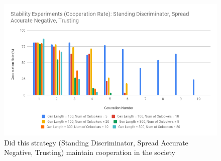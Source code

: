 \documentclass[]{final_report}
\begin{document}
\begin{figure}
\begin{framed}
	\includegraphics[width=\textwidth]{sdsantStabCoop.png}
	\caption{Did this strategy (Standing Discriminator, Spread Accurate Negative, Trusting) maintain cooperation in the society}
	\label{fig:sdsantStabCoop}
\end{framed}
\end{figure}
\end{document}
